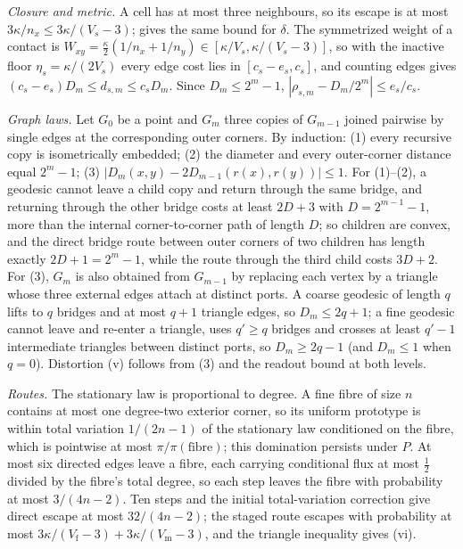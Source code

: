 \emph{Closure and metric.}
A cell has at most three neighbours, so its escape is at most $3\kappa/n_x\le3\kappa/(V_s-3)$;  gives the same bound for $\delta$.
The symmetrized weight of a contact is $W_{xy}=\tfrac\kappa2(1/n_x+1/n_y)\in[\kappa/V_s,\kappa/(V_s-3)]$, so with the inactive floor $\eta_s=\kappa/(2V_s)$ every edge cost lies in $[c_s-e_s,c_s]$, and counting edges gives $(c_s-e_s)D_m\le d_{s,m}\le c_sD_m$.
Since $D_m\le2^m-1$, $|\rho_{s,m}-D_m/2^m|\le e_s/c_s$.

\emph{Graph laws.}
Let $G_0$ be a point and $G_m$ three copies of $G_{m-1}$ joined pairwise by single edges at the corresponding outer corners.
By induction: (1) every recursive copy is isometrically embedded; (2) the diameter and every outer-corner distance equal $2^m-1$; (3) $|D_m(x,y)-2D_{m-1}(r(x),r(y))|\le1$.
For (1)--(2), a geodesic cannot leave a child copy and return through the same bridge, and returning through the other bridge costs at least $2D+3$ with $D=2^{m-1}-1$, more than the internal corner-to-corner path of length $D$; so children are convex, and the direct bridge route between outer corners of two children has length exactly $2D+1=2^m-1$, while the route through the third child costs $3D+2$.
For (3), $G_m$ is also obtained from $G_{m-1}$ by replacing each vertex by a triangle whose three external edges attach at distinct ports.
A coarse geodesic of length $q$ lifts to $q$ bridges and at most $q+1$ triangle edges, so $D_m\le2q+1$; a fine geodesic cannot leave and re-enter a triangle, uses $q'\ge q$ bridges and crosses at least $q'-1$ intermediate triangles between distinct ports, so $D_m\ge2q-1$ (and $D_m\le1$ when $q=0$).
Distortion (v) follows from (3) and the readout bound at both levels.

\emph{Routes.}
The stationary law is proportional to degree.
A fine fibre of size $n$ contains at most one degree-two exterior corner, so its uniform prototype is within total variation $1/(2n-1)$ of the stationary law conditioned on the fibre, which is pointwise at most $\pi/\pi(\text{fibre})$; this domination persists under $P$.
At most six directed edges leave a fibre, each carrying conditional flux at most $\tfrac12$ divided by the fibre's total degree, so each step leaves the fibre with probability at most $3/(4n-2)$.
Ten steps and the initial total-variation correction give direct escape at most $32/(4n-2)$; the staged route escapes with probability at most $3\kappa/(V_{\mathrm f}-3)+3\kappa/(V_{\mathrm m}-3)$, and the triangle inequality gives (vi).

